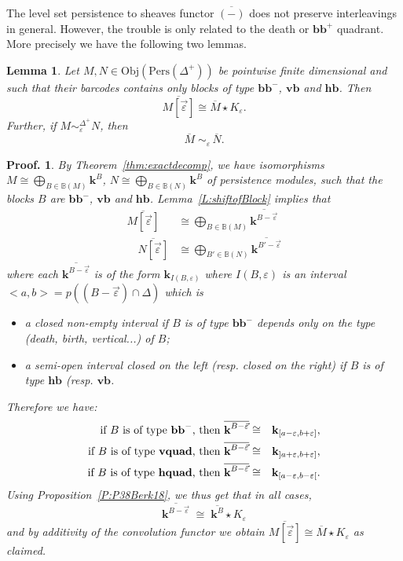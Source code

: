 \documentclass[a4paper, english, 11pt]{article}
\newcommand{\kk}[0]{\textbf{k}}
\newcommand{\Pe}{\text{Pers}}
\newcommand{\0}{\vec{0}}
\newcommand{\Obj}[0]{\text{Obj}}
\newtheorem*{pf}{Proof.} }
\newtheorem{lem}[prop]{Lemma}
\begin{document}
The level set persistence to sheaves functor $\overline{(-)}$ does not preserve
interleavings in general. However, the trouble is only related to the death or $\textbf{bb}^+$ quadrant. More precisely we have the following two lemmas.
\begin{lem}\label{L:Barpreserveentre} Let $M, N\in \Obj(\Pe(\Delta^+))$ be pointwise finite dimensional and such that their barcodes contains only blocks of type $\textbf{bb}^{-}$, $\textbf{vb}$ and $\textbf{hb}$. 
Then $$\overline{M [\vec{\varepsilon}]} \cong \overline{M}\star K_{\varepsilon}. $$ Further, 
if $M \sim_\varepsilon^{\Delta^+} N$, then 
 $$ \overline{M} \; \sim_\varepsilon \, \overline{N}.$$
\end{lem}
\begin{pf}
 By Theorem~\ref{thm:exactdecomp}, we have  isomorphisms 
 $M \cong\bigoplus_{B\in \mathbb{B}(M)} \kk^B$, 
 $N \cong \bigoplus_{B\in \mathbb{B}(N)} \kk^B$ of persistence modules, such that the blocks $B$ are $\textbf{bb}^{-}$, $\textbf{vb}$ and $\textbf{hb}$. Lemma~\ref{L:shiftofBlock} 
 implies that 
 \begin{align*}\overline{M[\vec{\varepsilon}]} &\cong \bigoplus_{B\in \mathbb{B}(M)} \overline{\kk^{B -\vec{\varepsilon}}}  \\ 
  \quad \overline{N[\vec{\varepsilon}]} &\cong \bigoplus_{B'\in \mathbb{B}(N)} \overline{\kk^{B' -\vec{\varepsilon}} }
  \end{align*}
 where each $\overline{\kk^{B -\vec{\varepsilon}}}$ is of the form 
 $\kk_{I(B, \varepsilon)}$ where $I(B, \varepsilon)$ is an interval $<a,b>=p((B-\vec{\varepsilon})\cap \Delta)$ which is
 \begin{itemize}\item a closed non-empty interval if $B$ is of type $\textbf{bb}^{-}$ depends only on the type (death, birth, vertical...) of $B$; 
  \item a semi-open interval closed on the left (resp. closed on the right) if  $B$ is of type $\textbf{hb}$ (resp. $\textbf{vb}$.
 \end{itemize}
Therefore we have: 
\begin{eqnarray*} 
 \text{if $B$ is of type $\textbf{bb}^{-}$, then }  \overline{\kk^{B-\vec{\varepsilon}}} 
 & \cong & \kk_{[a-\varepsilon, b+\varepsilon ]}, \\
 \text{if $B$ is of type \textbf{vquad}, then }  \overline{\kk^{B-\vec{\varepsilon}}} 
 & \cong & \kk_{]a+\varepsilon, b+\varepsilon ]}, \\
 \text{if $B$ is of type \textbf{hquad}, then }  \overline{\kk^{B-\vec{\varepsilon}}} 
 & \cong & \kk_{[a-\varepsilon, b-\varepsilon [}.
\end{eqnarray*}
 Using Proposition~\ref{P:P38Berk18}, we thus get that  in all cases, 
 $$ \overline{\kk^{B-\vec{\varepsilon}}} 
 \; \cong \;  \overline{\kk^B} \star K_\varepsilon $$ and by additivity of the convolution functor we obtain $\overline{M [\vec{\varepsilon}]} \cong \overline{M}\star K_{\varepsilon}$ as claimed.
 

\end{pf}
\end{document}

